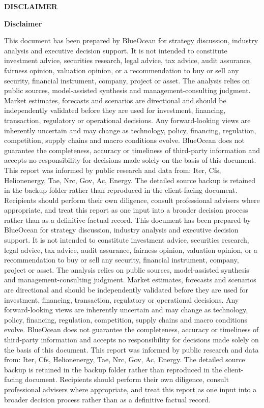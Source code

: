 \documentclass[10pt,a4paper]{article}
\begin{document}
\clearpage
{\textcolor{BOBlue}{\scriptsize\bfseries DISCLAIMER}}\par\vspace{3pt}
{\Large\sffamily\bfseries\color{BONavy} Disclaimer}\par\vspace{4pt}
\vspace{2pt}{\color{BOBright}\rule{\linewidth}{1pt}}\vspace{5pt}
{\footnotesize\color{BOMuted} This document has been prepared by BlueOcean for strategy discussion, industry analysis and executive decision support. It is not intended to constitute investment advice, securities research, legal advice, tax advice, audit assurance, fairness opinion, valuation opinion, or a recommendation to buy or sell any security, financial instrument, company, project or asset. The analysis relies on public sources, model-assisted synthesis and management-consulting judgment. Market estimates, forecasts and scenarios are directional and should be independently validated before they are used for investment, financing, transaction, regulatory or operational decisions. Any forward-looking views are inherently uncertain and may change as technology, policy, financing, regulation, competition, supply chains and macro conditions evolve. BlueOcean does not guarantee the completeness, accuracy or timeliness of third-party information and accepts no responsibility for decisions made solely on the basis of this document. This report was informed by public research and data from: Iter, Cfs, Helionenergy, Tae, Nrc, Gov, Ac, Energy. The detailed source backup is retained in the backup folder rather than reproduced in the client-facing document. Recipients should perform their own diligence, consult professional advisers where appropriate, and treat this report as one input into a broader decision process rather than as a definitive factual record. This document has been prepared by BlueOcean for strategy discussion, industry analysis and executive decision support. It is not intended to constitute investment advice, securities research, legal advice, tax advice, audit assurance, fairness opinion, valuation opinion, or a recommendation to buy or sell any security, financial instrument, company, project or asset. The analysis relies on public sources, model-assisted synthesis and management-consulting judgment. Market estimates, forecasts and scenarios are directional and should be independently validated before they are used for investment, financing, transaction, regulatory or operational decisions. Any forward-looking views are inherently uncertain and may change as technology, policy, financing, regulation, competition, supply chains and macro conditions evolve. BlueOcean does not guarantee the completeness, accuracy or timeliness of third-party information and accepts no responsibility for decisions made solely on the basis of this document. This report was informed by public research and data from: Iter, Cfs, Helionenergy, Tae, Nrc, Gov, Ac, Energy. The detailed source backup is retained in the backup folder rather than reproduced in the client-facing document. Recipients should perform their own diligence, consult professional advisers where appropriate, and treat this report as one input into a broader decision process rather than as a definitive factual record.}
\end{document}
